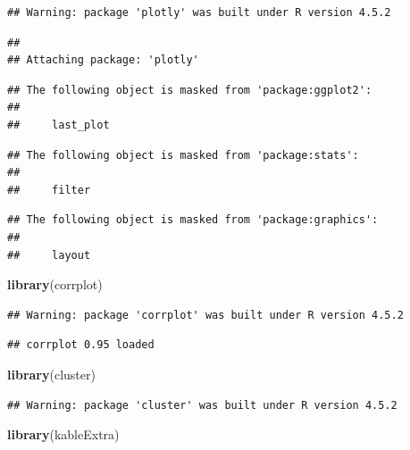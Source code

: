 \documentclass[
]{article}
\newenvironment{Shaded}{\begin{snugshade}}{\end{snugshade}}
\newcommand{\FunctionTok}[1]{\textcolor[rgb]{0.13,0.29,0.53}{\textbf{#1}}}
\newcommand{\NormalTok}[1]{#1}
\begin{document}
\begin{verbatim}
## Warning: package 'plotly' was built under R version 4.5.2
\end{verbatim}

\begin{verbatim}
## 
## Attaching package: 'plotly'
\end{verbatim}

\begin{verbatim}
## The following object is masked from 'package:ggplot2':
## 
##     last_plot
\end{verbatim}

\begin{verbatim}
## The following object is masked from 'package:stats':
## 
##     filter
\end{verbatim}

\begin{verbatim}
## The following object is masked from 'package:graphics':
## 
##     layout
\end{verbatim}

\begin{Shaded}
\begin{Highlighting}[]
\FunctionTok{library}\NormalTok{(corrplot)}
\end{Highlighting}
\end{Shaded}

\begin{verbatim}
## Warning: package 'corrplot' was built under R version 4.5.2
\end{verbatim}

\begin{verbatim}
## corrplot 0.95 loaded
\end{verbatim}

\begin{Shaded}
\begin{Highlighting}[]
\FunctionTok{library}\NormalTok{(cluster)}
\end{Highlighting}
\end{Shaded}

\begin{verbatim}
## Warning: package 'cluster' was built under R version 4.5.2
\end{verbatim}

\begin{Shaded}
\begin{Highlighting}[]
\FunctionTok{library}\NormalTok{(kableExtra)}
\end{Highlighting}
\end{Shaded}
\end{document}
